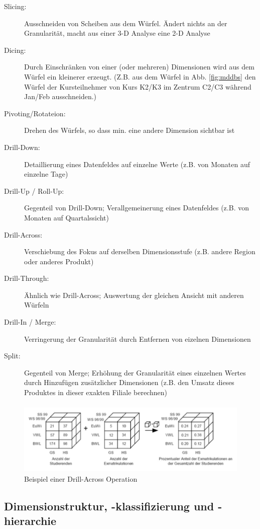 \documentclass[a4paper, 11pt, nofootinbib]{article}
\begin{document}
\begin{description}
	\item[Slicing: ] Ausschneiden von Scheiben aus dem Würfel. Ändert nichts an der Granularität, macht aus einer 3-D Analyse eine 2-D Analyse
	\item[Dicing: ] Durch Einschränken von einer (oder mehreren) Dimensionen wird aus dem Würfel ein kleinerer erzeugt. (Z.B. aus dem Würfel in Abb. \ref{fig:mddbs} den Würfel der Kursteilnehmer von Kurs K2/K3 im Zentrum C2/C3 während Jan/Feb ausschneiden.)
	\item[Pivoting/Rotateion: ] Drehen des Würfels, so dass min. eine andere Dimension sichtbar ist
	\item[Drill-Down: ] Detaillierung eines Datenfeldes auf einzelne Werte (z.B. von Monaten auf einzelne Tage)
	\item[Drill-Up / Roll-Up: ] Gegenteil von Drill-Down; Verallgemeinerung eines Datenfeldes (z.B. von Monaten auf Quartalssicht)
	\item[Drill-Across: ] Verschiebung des Fokus auf derselben Dimensionsstufe (z.B. andere Region oder anderes Produkt)
	\item[Drill-Through: ] Ähnlich wie Drill-Across; Auswertung der gleichen Ansicht mit anderen Würfeln
	\item[Drill-In / Merge: ] Verringerung der Granularität durch Entfernen von eizelnen Dimensionen
	\item[Split: ] Gegenteil von Merge; Erhöhung der Granularität eines einzelnen Wertes durch Hinzufügen zusätzlicher Dimensionen (z.B. den Umsatz dieses Produktes in dieser exakten Filiale berechnen)
\end{description}

\begin{figure}[htb]
	\centering
	\includegraphics[keepaspectratio=true,height=8\baselineskip]{drill_across.jpg}
	\caption{Beispiel einer Drill-Across Operation}
	\label{fig:rel}
\end{figure}


\newpage

\subsection{Dimensionstruktur, -klassifizierung und -hierarchie}
\end{document}

